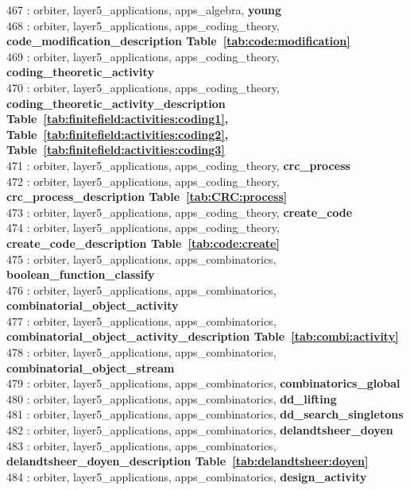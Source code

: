 467 : orbiter, layer5\_applications, apps\_algebra, {\bf young}\\
468 : orbiter, layer5\_applications, apps\_coding\_theory, {\bf code\_modification\_description Table~\ref{tab:code:modification}}\\
469 : orbiter, layer5\_applications, apps\_coding\_theory, {\bf coding\_theoretic\_activity}\\
470 : orbiter, layer5\_applications, apps\_coding\_theory, {\bf coding\_theoretic\_activity\_description Table~\ref{tab:finitefield:activities:coding1},  Table~\ref{tab:finitefield:activities:coding2},  Table~\ref{tab:finitefield:activities:coding3}}\\
471 : orbiter, layer5\_applications, apps\_coding\_theory, {\bf crc\_process}\\
472 : orbiter, layer5\_applications, apps\_coding\_theory, {\bf crc\_process\_description Table~\ref{tab:CRC:process}}\\
473 : orbiter, layer5\_applications, apps\_coding\_theory, {\bf create\_code}\\
474 : orbiter, layer5\_applications, apps\_coding\_theory, {\bf create\_code\_description Table~\ref{tab:code:create}}\\
475 : orbiter, layer5\_applications, apps\_combinatorics, {\bf boolean\_function\_classify}\\
476 : orbiter, layer5\_applications, apps\_combinatorics, {\bf combinatorial\_object\_activity}\\
477 : orbiter, layer5\_applications, apps\_combinatorics, {\bf combinatorial\_object\_activity\_description Table~\ref{tab:combi:activity}}\\
478 : orbiter, layer5\_applications, apps\_combinatorics, {\bf combinatorial\_object\_stream}\\
479 : orbiter, layer5\_applications, apps\_combinatorics, {\bf combinatorics\_global}\\
480 : orbiter, layer5\_applications, apps\_combinatorics, {\bf dd\_lifting}\\
481 : orbiter, layer5\_applications, apps\_combinatorics, {\bf dd\_search\_singletons}\\
482 : orbiter, layer5\_applications, apps\_combinatorics, {\bf delandtsheer\_doyen}\\
483 : orbiter, layer5\_applications, apps\_combinatorics, {\bf delandtsheer\_doyen\_description Table~\ref{tab:delandtsheer:doyen}}\\
484 : orbiter, layer5\_applications, apps\_combinatorics, {\bf design\_activity}\\
